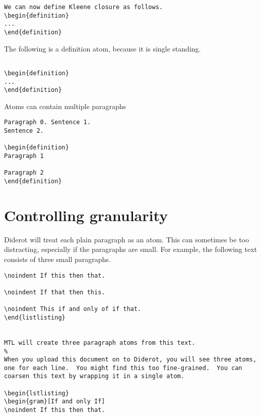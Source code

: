 \begin{example}
\begin{noten}
\begin{important}
\begin{lstlisting}
We can now define Kleene closure as follows.
\begin{definition}
...
\end{definition}
\end{lstlisting}

The following is a definition atom, because it is single standing.
\begin{lstlisting}

\begin{definition}
...
\end{definition}

\end{lstlisting}

\begin{note}
Atoms can contain multiple paragraphs


\begin{lstlisting}
Paragraph 0. Sentence 1.
Sentence 2.

\begin{definition}
Paragraph 1

Paragraph 2
\end{definition}
\end{lstlisting}
\end{note}

\section{Controlling granularity}

Diderot will treat each plain paragraph as an atom.  This can sometimes be too distracting, especially if the paragraphs are small.  For example, the following text consists of three small paragraphs.
%
\begin{lstlisting}
\noindent If this then that.

\noindent If that then this.

\noindent This if and only of if that.
\end{listlisting}


MTL will create three paragraph atoms from this text. 
%
When you upload this document on to Diderot, you will see three atoms, one for each line.  You might find this too fine-grained.  You can coarsen this text by wrapping it in a single atom.

\begin{lstlisting}
\begin{gram}[If and only If]
\noindent If this then that.


\end{lstlisting}
\end{important}
\end{noten}
\end{example}
